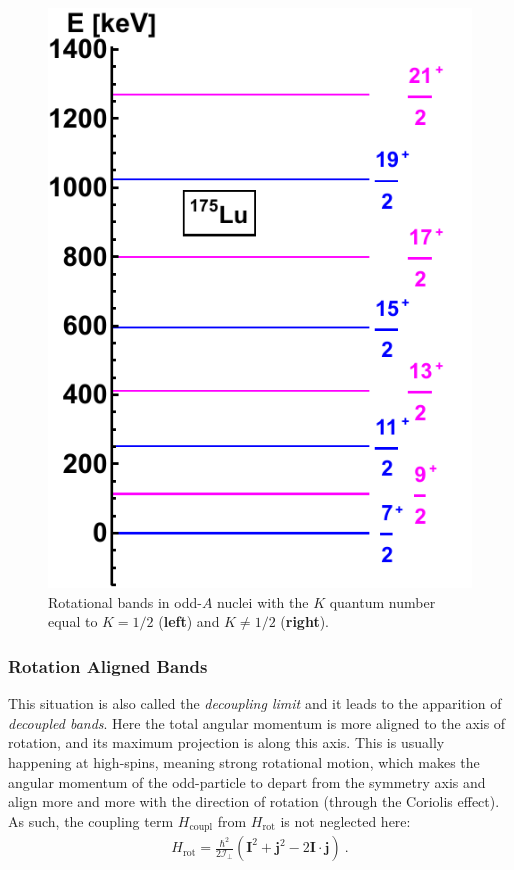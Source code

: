 \begin{figure}
    \includegraphics[scale=0.7]{Chapters/Figures/Lu175-Rotational-Bands.pdf}
    \caption{Rotational bands in odd-$A$ nuclei with the $K$ quantum number equal to $K=1/2$ (\textbf{left}) and $K\neq 1/2$ (\textbf{right}).}
    \label{rotational-bands-odd-a}
\end{figure}

\subsubsection{Rotation Aligned Bands}
\label{section-ral-signature}
This situation is also called the \emph{decoupling limit} \cite{bohr1998nuclear} and it leads to the apparition of \emph{decoupled bands}. Here the total angular momentum is more aligned to the axis of rotation, and its maximum projection is along this axis. This is usually happening at high-spins, meaning strong rotational motion, which makes the angular momentum of the odd-particle to depart from the symmetry axis and align more and more with the direction of rotation (through the Coriolis effect). As such, the coupling term $H_\text{coupl}$ from $H_\text{rot}$ is not neglected here:
\begin{align}
    H_\text{rot}=\frac{\hbar^2}{2\mathcal{I}_\perp}\left(\mathbf{I}^2+\mathbf{j}^2-2\mathbf{I}\cdot\mathbf{j}\right)\ .
\end{align}

